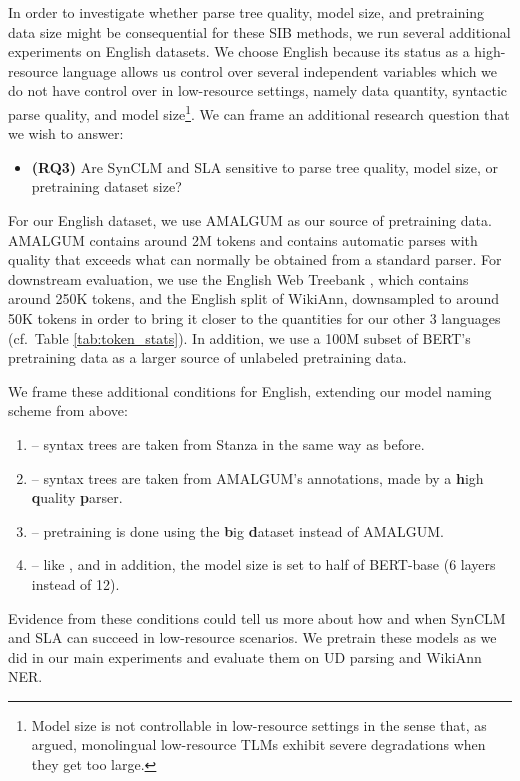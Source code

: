 \documentclass[11pt]{article}
\begin{document}
In order to investigate whether parse tree quality, model size, and pretraining data size might be consequential for these SIB methods, we run several additional experiments on English datasets.
We choose English because its status as a high-resource language allows us control over several independent variables which we do not have control over in low-resource settings, namely data quantity, syntactic parse quality, and model size\footnote{Model size is not controllable in low-resource settings in the sense that, as \citet{gessler-zeldes-2022-microbert} argued, monolingual low-resource TLMs exhibit severe degradations when they get too large.}.
We can frame an additional research question that we wish to answer:
\begin{itemize}
    \item \textbf{(RQ3)} Are SynCLM and SLA sensitive to parse tree quality, model size, or pretraining dataset size?
\end{itemize}

For our English dataset, we use AMALGUM \citep{gessler-etal-2020-amalgum} as our source of pretraining data.
AMALGUM contains around 2M tokens and contains automatic parses with quality that exceeds what can normally be obtained from a standard parser.
For downstream evaluation, we use the English Web Treebank \citep{silveira14gold}, which contains around 250K tokens, and the English split of WikiAnn, downsampled to around 50K tokens in order to bring it closer to the quantities for our other 3 languages (cf.~Table \ref{tab:token_stats}).
In addition, we use a 100M subset of BERT's pretraining data as a larger source of unlabeled pretraining data.

We frame these additional conditions for English, extending our model naming scheme from above:
\begin{enumerate}
\setlength\itemsep{0em}
    \item \np{} -- syntax trees are taken from Stanza in the same way as before.
    \item \hqp{} -- syntax trees are taken from AMALGUM's annotations, made by a \textbf{h}igh \textbf{q}uality \textbf{p}arser.
    \item \bd{} -- pretraining is done using the \textbf{b}ig \textbf{d}ataset instead of AMALGUM.
    \item \bd{}\bm{} -- like \bd{}, and in addition, the model size is set to half of BERT-base (6 layers instead of 12).
\end{enumerate}
Evidence from these conditions could tell us more about how and when SynCLM and SLA can succeed in low-resource scenarios.
We pretrain these models as we did in our main experiments and evaluate them on UD parsing and WikiAnn NER.
\end{document}
